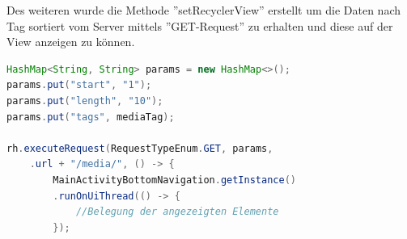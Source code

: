 Des weiteren wurde die Methode ''setRecyclerView'' erstellt um die Daten nach Tag sortiert vom Server mittels ''GET-Request'' zu erhalten und diese auf der View anzeigen zu können.


\begin{lstlisting}[language=Java,caption={Anfordern und anzeigen der Daten vom Server im MediaOverviewFragment}]
HashMap<String, String> params = new HashMap<>();
params.put("start", "1");
params.put("length", "10");
params.put("tags", mediaTag);
        
rh.executeRequest(RequestTypeEnum.GET, params, 										MainActivityBottomNavigation.getInstance()
    .url + "/media/", () -> {
    	MainActivityBottomNavigation.getInstance()
    	.runOnUiThread(() -> {
			//Belegung der angezeigten Elemente            
		});
\end{lstlisting}
